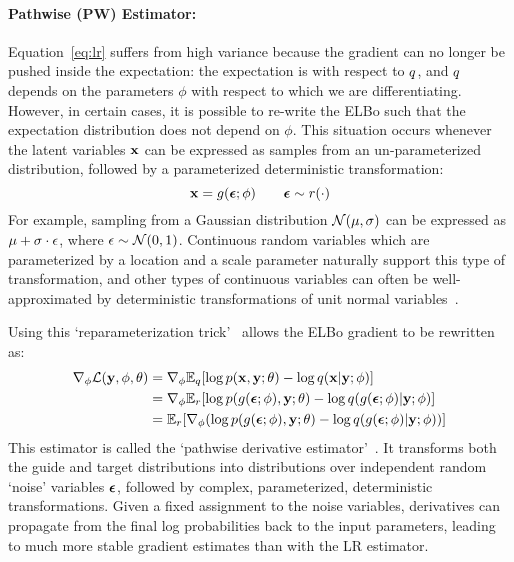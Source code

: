 \paragraph{Pathwise (PW) Estimator:}

Equation~\ref{eq:lr} suffers from high variance because the gradient can no longer be pushed inside the expectation: the expectation is with respect to $q$, and $q$ depends on the parameters $\phi$ with respect to which we are differentiating.
However, in certain cases, it is possible to re-write the ELBo such that the expectation distribution does not depend on $\phi$.
This situation occurs whenever the latent variables $\mathbf{x}$ can be expressed as samples from an un-parameterized distribution, followed by a parameterized deterministic transformation:
\begin{equation*}
\mathbf{x} = g(\bm{\epsilon} ; \phi) \hspace{2em} \bm{\epsilon} \sim r(\cdot)
\end{equation*}
For example, sampling from a Gaussian distribution $\mathcal{N}(\mu, \sigma)$ can be expressed as $\mu + \sigma \cdot \epsilon$, where $\epsilon \sim \mathcal{N}(0, 1)$. Continuous random variables which are parameterized by a location and a scale parameter naturally support this type of transformation, and other types of continuous variables can often be well-approximated by deterministic transformations of unit normal variables~\cite{ADVI}.

Using this `reparameterization trick'~\cite{AEVB} allows the ELBo gradient to be rewritten as:
\begin{align}
\begin{split}
\nabla_\phi \mathcal{L}(\mathbf{y}, \phi, \theta)
&= \nabla_\phi \mathbb{E}_{q}[ \log p(\mathbf{x}, \mathbf{y}; \theta) - \log q(\mathbf{x} | \mathbf{y} ; \phi) ]\\
&= \nabla_\phi \mathbb{E}_{r} [ \log p(g(\bm{\epsilon} ; \phi), \mathbf{y} ; \theta) - \log q(g(\bm{\epsilon} ; \phi) | \mathbf{y} ; \phi) ]\\
&= \mathbb{E}_{r} [\nabla_\phi ( \log p(g(\bm{\epsilon} ; \phi), \mathbf{y} ; \theta) - \log q(g(\bm{\epsilon} ; \phi) | \mathbf{y} ; \phi) ) ]
\end{split}
\label{eq:pw}
\end{align}
This estimator is called the `pathwise derivative estimator'~\cite{PathwiseEstimator}.
It transforms both the guide and target distributions into distributions over independent random `noise' variables $\bm{\epsilon}$, followed by complex, parameterized, deterministic transformations. Given a fixed assignment to the noise variables, derivatives can propagate from the final log probabilities back to the input parameters, leading to much more stable gradient estimates than with the LR estimator.

